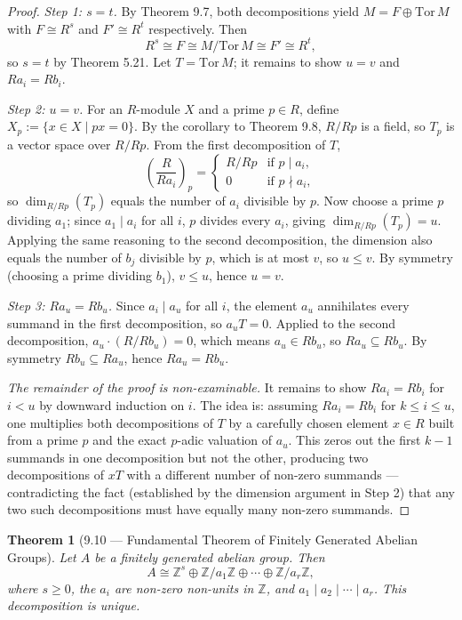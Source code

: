 \documentclass[12pt]{article}
\newtheorem{theorem}{Theorem}
\begin{document}
\begin{proof}
\textit{Step 1: $s = t$.} By Theorem 9.7, both decompositions yield $M = F \oplus \mathrm{Tor}\,M$ with $F \cong R^s$ and $F' \cong R^t$ respectively. Then
\[
  R^s \cong F \cong M/\mathrm{Tor}\,M \cong F' \cong R^t,
\]
so $s = t$ by Theorem 5.21. Let $T = \mathrm{Tor}\,M$; it remains to show $u = v$ and $Ra_i = Rb_i$.

\textit{Step 2: $u = v$.} For an $R$-module $X$ and a prime $p \in R$, define $X_p := \{x \in X \mid px = 0\}$. By the corollary to Theorem 9.8, $R/Rp$ is a field, so $T_p$ is a vector space over $R/Rp$. From the first decomposition of $T$,
\[
  \left(\frac{R}{Ra_i}\right)_p = \begin{cases} R/Rp & \text{if } p \mid a_i, \\ 0 & \text{if } p \nmid a_i, \end{cases}
\]
so $\dim_{R/Rp}(T_p)$ equals the number of $a_i$ divisible by $p$. Now choose a prime $p$ dividing $a_1$; since $a_1 \mid a_i$ for all $i$, $p$ divides every $a_i$, giving $\dim_{R/Rp}(T_p) = u$. Applying the same reasoning to the second decomposition, the dimension also equals the number of $b_j$ divisible by $p$, which is at most $v$, so $u \leq v$. By symmetry (choosing a prime dividing $b_1$), $v \leq u$, hence $u = v$.

\textit{Step 3: $Ra_u = Rb_u$.} Since $a_i \mid a_u$ for all $i$, the element $a_u$ annihilates every summand in the first decomposition, so $a_u T = 0$. Applied to the second decomposition, $a_u \cdot (R/Rb_u) = 0$, which means $a_u \in Rb_u$, so $Ra_u \subseteq Rb_u$. By symmetry $Rb_u \subseteq Ra_u$, hence $Ra_u = Rb_u$.

\textit{The remainder of the proof is non-examinable.} It remains to show $Ra_i = Rb_i$ for $i < u$ by downward induction on $i$. The idea is: assuming $Ra_i = Rb_i$ for $k \leq i \leq u$, one multiplies both decompositions of $T$ by a carefully chosen element $x \in R$ built from a prime $p$ and the exact $p$-adic valuation of $a_u$. This zeros out the first $k-1$ summands in one decomposition but not the other, producing two decompositions of $xT$ with a different number of non-zero summands — contradicting the fact (established by the dimension argument in Step 2) that any two such decompositions must have equally many non-zero summands.
\end{proof}

\begin{theorem}[9.10 — Fundamental Theorem of Finitely Generated Abelian Groups]
Let $A$ be a finitely generated abelian group. Then
\[
  A \cong \mathbb{Z}^s \oplus \mathbb{Z}/a_1\mathbb{Z} \oplus \cdots \oplus \mathbb{Z}/a_r\mathbb{Z},
\]
where $s \geq 0$, the $a_i$ are non-zero non-units in $\mathbb{Z}$, and $a_1 \mid a_2 \mid \cdots \mid a_r$. This decomposition is unique.
\end{theorem}
\end{document}
